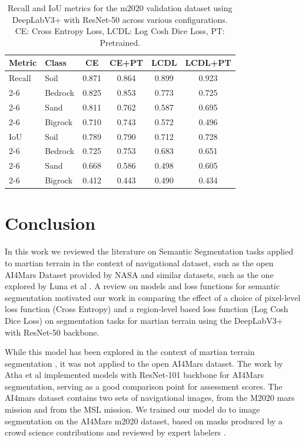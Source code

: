 \documentclass[10pt, conference]{IEEEtran}
\begin{document}
\begin{table}[h]
  \centering
  \begin{tabular}{|l|l|c|c|c|c|}
    \hline
    \textbf{Metric} & \textbf{Class} & \textbf{CE} & \textbf{CE+PT} & \textbf{LCDL} & \textbf{LCDL+PT} \\ \hline
    \hline
    Recall & Soil    & 0.871 & 0.864 & 0.899 & 0.923 \\ \cline{2-6}
                    & Bedrock & 0.825 & 0.853 & 0.773 & 0.725 \\ \cline{2-6}
                    & Sand    & 0.811 & 0.762 & 0.587 & 0.695 \\ \cline{2-6}
                    & Bigrock & 0.710 & 0.743 & 0.572 & 0.496 \\ \hline
    \hline
    IoU    & Soil    & 0.789 & 0.790 & 0.712 & 0.728 \\ \cline{2-6}
                    & Bedrock & 0.725 & 0.753 & 0.683 & 0.651 \\ \cline{2-6}
                    & Sand    & 0.668 & 0.586 & 0.498 & 0.605 \\ \cline{2-6}
                    & Bigrock & 0.412 & 0.443 & 0.490 & 0.434 \\ \hline
  \end{tabular}
  \caption{Recall and IoU metrics for the m2020 validation dataset using DeepLabV3+ with ResNet-50 across various configurations. CE: Cross Entropy Loss, LCDL: Log Cosh Dice Loss, PT: Pretrained.}
  \label{tab:m2020_results}
\end{table}


\section{Conclusion}

In this work we reviewed the literature on Semantic Segmentation tasks applied to martian terrain in the
context of navigational dataset, such as the open AI4Mars Dataset provided by NASA \cite{Swan2021} and
similar datasets, such as the one explored by Luna et al \cite{Luna2025}. A review on models and
loss functions for semantic segmentation \cite{Azad2023, Kale2021, Sultana2020, Minaee2020} motivated
our work in comparing the effect of a choice of pixel-level loss function (Cross Entropy) and a
region-level based loss function (Log Cosh Dice Loss) on segmentation tasks for martian terrain using the
DeepLabV3+ with ResNet-50 backbone.

While this model has been explored in the context of martian terrain segmentation \cite{Luna2025}, it
was not applied to the open AI4Mars dataset. The work by Atha et al \cite{Atha2022} implemented
models with ResNet-101 backbone for AI4Mars segmentation, serving as a good comparison point for
assessment scores. The AI4mars dataset contains two sets of navigational images, from the M2020 mars mission
and from the MSL mission. We trained our model do to image segmentation on the AI4Mars m2020 dataset, based
on masks produced by a crowd science contributions and reviewed by expert labelers \cite{Swan2021}.
\end{document}
